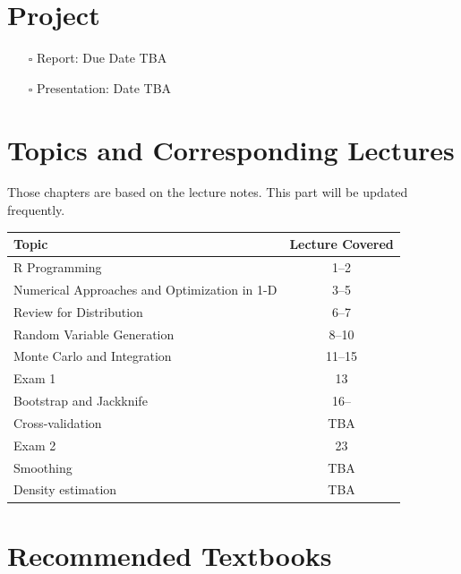 \documentclass[
  letterpaper,
  DIV=11,
  numbers=noendperiod]{scrreprt}
\providecommand{\tightlist}{%
  \setlength{\itemsep}{0pt}\setlength{\parskip}{0pt}}
\begin{document}
\section*{Project}\label{project}


\begin{itemize}
\tightlist
\item[$\square$]
  Report: Due Date TBA
\item[$\square$]
  Presentation: Date TBA
\end{itemize}

\section*{Topics and Corresponding
Lectures}\label{topics-and-corresponding-lectures}


Those chapters are based on the lecture notes. This part will be updated
frequently.

\begin{longtable}[]{@{}lc@{}}
\toprule\noalign{}
Topic & Lecture Covered \\
\midrule\noalign{}
\endhead
\bottomrule\noalign{}
\endlastfoot
R Programming & 1--2 \\
Numerical Approaches and Optimization in 1-D & 3--5 \\
Review for Distribution & 6--7 \\
Random Variable Generation & 8--10 \\
Monte Carlo and Integration & 11--15 \\
Exam 1 & 13 \\
Bootstrap and Jackknife & 16-- \\
Cross-validation & TBA \\
Exam 2 & 23 \\
Smoothing & TBA \\
Density estimation & TBA \\
\end{longtable}

\section*{Recommended Textbooks}\label{recommended-textbooks}
\end{document}
